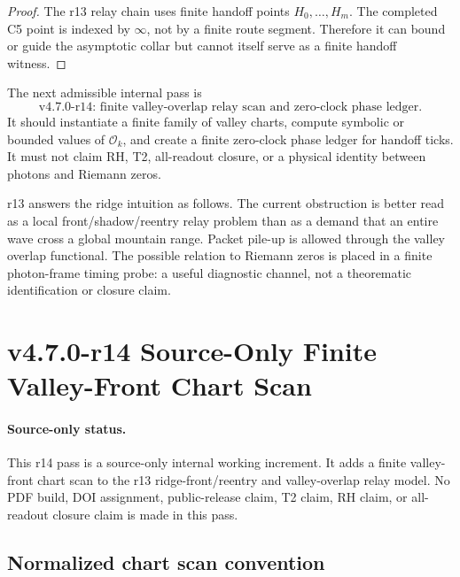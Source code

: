 \begin{proof}
The r13 relay chain uses finite handoff points \(H_0,\ldots,H_m\).  The completed
C5 point is indexed by \(\infty\), not by a finite route segment.  Therefore it
can bound or guide the asymptotic collar but cannot itself serve as a finite
handoff witness.
\end{proof}

\begin{corollary}
\label{cor:v470-r13-permitted-r14-direction}
The next admissible internal pass is
\[
\text{v4.7.0-r14: finite valley-overlap relay scan and zero-clock phase ledger.}
\]
It should instantiate a finite family of valley charts, compute symbolic or
bounded values of \(\mathcal O_k\), and create a finite zero-clock phase ledger
for handoff ticks.  It must not claim RH, T2, all-readout closure, or a physical
identity between photons and Riemann zeros.
\end{corollary}

\begin{remark}[r13 summary]
r13 answers the ridge intuition as follows.  The current obstruction is better
read as a local front/shadow/reentry relay problem than as a demand that an entire
wave cross a global mountain range.  Packet pile-up is allowed through the valley
overlap functional.  The possible relation to Riemann zeros is placed in a
finite photon-frame timing probe: a useful diagnostic channel, not a theorematic
identification or closure claim.
\end{remark}


\section{v4.7.0-r14 Source-Only Finite Valley-Front Chart Scan}
\label{sec:v470-r14-finite-valley-front-chart-scan}

\paragraph{Source-only status.}
This r14 pass is a source-only internal working increment.  It adds a finite
valley-front chart scan to the r13 ridge-front/reentry and valley-overlap relay
model.  No PDF build, DOI assignment, public-release claim, T2 claim, RH claim,
or all-readout closure claim is made in this pass.

\subsection{Normalized chart scan convention}
\label{subsec:v470-r14-normalized-chart-scan-convention}

